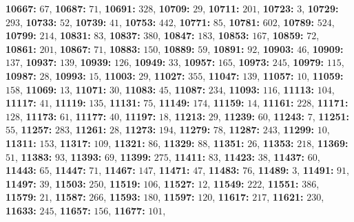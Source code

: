 \textsf{\bfseries 10667:} $67$, \textsf{\bfseries 10687:} $71$, \textsf{\bfseries 10691:} $328$, \textsf{\bfseries 10709:} $29$, \textsf{\bfseries 10711:} $201$, \textsf{\bfseries 10723:} $3$, \textsf{\bfseries 10729:} $293$, \textsf{\bfseries 10733:} $52$, \textsf{\bfseries 10739:} $41$, \textsf{\bfseries 10753:} $442$, \textsf{\bfseries 10771:} $85$, \textsf{\bfseries 10781:} $602$, \textsf{\bfseries 10789:} $524$, \textsf{\bfseries 10799:} $214$, \textsf{\bfseries 10831:} $83$, \textsf{\bfseries 10837:} $380$, \textsf{\bfseries 10847:} $183$, \textsf{\bfseries 10853:} $167$, \textsf{\bfseries 10859:} $72$, \textsf{\bfseries 10861:} $201$, \textsf{\bfseries 10867:} $71$, \textsf{\bfseries 10883:} $150$, \textsf{\bfseries 10889:} $59$, \textsf{\bfseries 10891:} $92$, \textsf{\bfseries 10903:} $46$, \textsf{\bfseries 10909:} $137$, \textsf{\bfseries 10937:} $139$, \textsf{\bfseries 10939:} $126$, \textsf{\bfseries 10949:} $33$, \textsf{\bfseries 10957:} $165$, \textsf{\bfseries 10973:} $245$, \textsf{\bfseries 10979:} $115$, \textsf{\bfseries 10987:} $28$, \textsf{\bfseries 10993:} $15$, \textsf{\bfseries 11003:} $29$, \textsf{\bfseries 11027:} $355$, \textsf{\bfseries 11047:} $139$, \textsf{\bfseries 11057:} $10$, \textsf{\bfseries 11059:} $158$, \textsf{\bfseries 11069:} $13$, \textsf{\bfseries 11071:} $30$, \textsf{\bfseries 11083:} $45$, \textsf{\bfseries 11087:} $234$, \textsf{\bfseries 11093:} $116$, \textsf{\bfseries 11113:} $104$, \textsf{\bfseries 11117:} $41$, \textsf{\bfseries 11119:} $135$, \textsf{\bfseries 11131:} $75$, \textsf{\bfseries 11149:} $174$, \textsf{\bfseries 11159:} $14$, \textsf{\bfseries 11161:} $228$, \textsf{\bfseries 11171:} $128$, \textsf{\bfseries 11173:} $61$, \textsf{\bfseries 11177:} $40$, \textsf{\bfseries 11197:} $18$, \textsf{\bfseries 11213:} $29$, \textsf{\bfseries 11239:} $60$, \textsf{\bfseries 11243:} $7$, \textsf{\bfseries 11251:} $55$, \textsf{\bfseries 11257:} $283$, \textsf{\bfseries 11261:} $28$, \textsf{\bfseries 11273:} $194$, \textsf{\bfseries 11279:} $78$, \textsf{\bfseries 11287:} $243$, \textsf{\bfseries 11299:} $10$, \textsf{\bfseries 11311:} $153$, \textsf{\bfseries 11317:} $109$, \textsf{\bfseries 11321:} $86$, \textsf{\bfseries 11329:} $88$, \textsf{\bfseries 11351:} $26$, \textsf{\bfseries 11353:} $218$, \textsf{\bfseries 11369:} $51$, \textsf{\bfseries 11383:} $93$, \textsf{\bfseries 11393:} $69$, \textsf{\bfseries 11399:} $275$, \textsf{\bfseries 11411:} $83$, \textsf{\bfseries 11423:} $38$, \textsf{\bfseries 11437:} $60$, \textsf{\bfseries 11443:} $65$, \textsf{\bfseries 11447:} $71$, \textsf{\bfseries 11467:} $147$, \textsf{\bfseries 11471:} $47$, \textsf{\bfseries 11483:} $76$, \textsf{\bfseries 11489:} $3$, \textsf{\bfseries 11491:} $91$, \textsf{\bfseries 11497:} $39$, \textsf{\bfseries 11503:} $250$, \textsf{\bfseries 11519:} $106$, \textsf{\bfseries 11527:} $12$, \textsf{\bfseries 11549:} $222$, \textsf{\bfseries 11551:} $386$, \textsf{\bfseries 11579:} $21$, \textsf{\bfseries 11587:} $266$, \textsf{\bfseries 11593:} $180$, \textsf{\bfseries 11597:} $120$, \textsf{\bfseries 11617:} $217$, \textsf{\bfseries 11621:} $230$, \textsf{\bfseries 11633:} $245$, \textsf{\bfseries 11657:} $156$, \textsf{\bfseries 11677:} $101$, 
